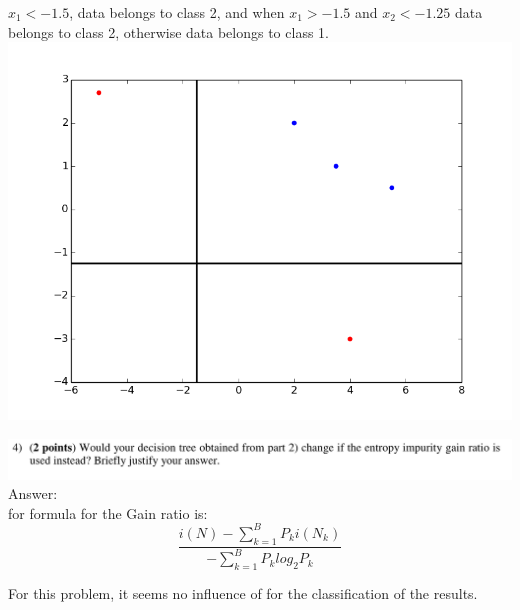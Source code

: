 \documentclass{article}
\begin{document}
$x_1 < -1.5$, data belongs to class 2, and when $x_1 >-1.5$ and $x_2<-1.25$ data belongs to class 2, otherwise data belongs to class 1.\\
\includegraphics[scale=0.5]{tree_boundary.png}

\includegraphics[width=1\columnwidth]{problem3_4.png}\\
Answer:\\
for formula for the Gain ratio is:\\
\begin{equation*}
\frac{i(N)-\sum_{k=1}^{B}P_ki(N_k)}{-\sum_{k=1}^{B}P_k log_2P_k}
\end{equation*}

For this problem, it seems no influence of for the classification of the results.
\end{document}
